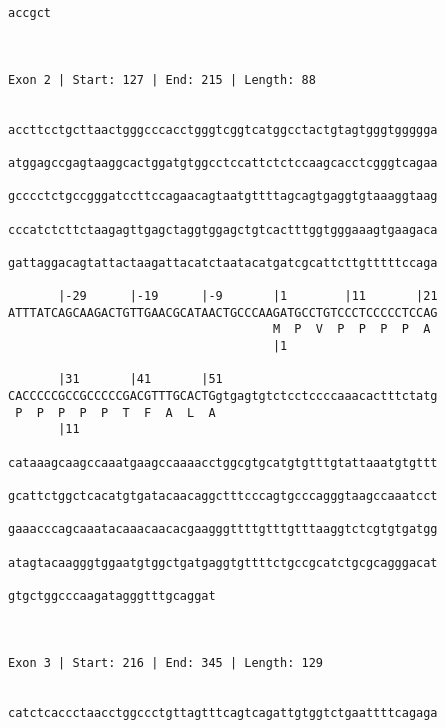 \documentclass{article}
\begin{document}
\begin{Verbatim}
accgct
      
      
 
Exon 2 | Start: 127 | End: 215 | Length: 88


accttcctgcttaactgggcccacctgggtcggtcatggcctactgtagtgggtggggga
                                                            
atggagccgagtaaggcactggatgtggcctccattctctccaagcacctcgggtcagaa
                                                            
gcccctctgccgggatccttccagaacagtaatgttttagcagtgaggtgtaaaggtaag
                                                            
cccatctcttctaagagttgagctaggtggagctgtcactttggtgggaaagtgaagaca
                                                            
gattaggacagtattactaagattacatctaatacatgatcgcattcttgtttttccaga
                                                            
       |-29      |-19      |-9       |1        |11       |21
ATTTATCAGCAAGACTGTTGAACGCATAACTGCCCAAGATGCCTGTCCCTCCCCCTCCAG
                                     M  P  V  P  P  P  P  A 
                                     |1                    
  
       |31       |41       |51                              
CACCCCCGCCGCCCCCGACGTTTGCACTGgtgagtgtctcctccccaaacactttctatg
 P  P  P  P  P  T  F  A  L  A                               
       |11                                                  
  
cataaagcaagccaaatgaagccaaaacctggcgtgcatgtgtttgtattaaatgtgttt
                                                            
gcattctggctcacatgtgatacaacaggctttcccagtgcccagggtaagccaaatcct
                                                            
gaaacccagcaaatacaaacaacacgaagggttttgtttgtttaaggtctcgtgtgatgg
                                                            
atagtacaagggtggaatgtggctgatgaggtgttttctgccgcatctgcgcagggacat
                                                            
gtgctggcccaagatagggtttgcaggat
                             
                             
 
Exon 3 | Start: 216 | End: 345 | Length: 129


catctcaccctaacctggccctgttagtttcagtcagattgtggtctgaattttcagaga
                                                            

\end{Verbatim}
\end{document}
